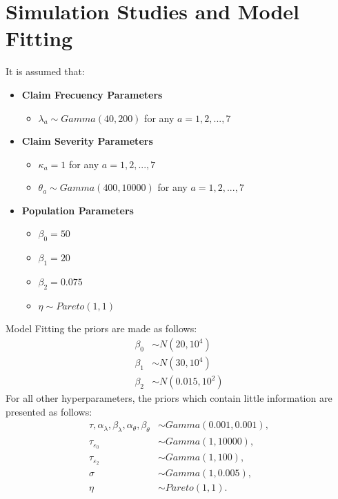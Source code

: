 \documentclass[10pt]{beamer} %
\begin{document}
\section{Simulation Studies and Model Fitting}
\begin{frame}{}
    It is assumed that: \\
\begin{itemize}
	\item \textbf{Claim Frecuency Parameters}
	\begin{itemize}
		\item $\lambda_{a}\sim Gamma(40,200)$ for any $a=1,2,...,7$
	\end{itemize}
	\item \textbf{Claim Severity Parameters}
	\begin{itemize}
		\item $\kappa_{a}=1$ for any $a=1,2,...,7$
		\item $\theta_{a}\sim Gamma(400,10000)$ for any $a=1,2,...,7$ 
	\end{itemize}
	\item \textbf{Population Parameters}
	\begin{itemize}
		\item $\beta_{0}=50$
		\item $\beta_{1}=20$
		\item $\beta_{2}=0.075$
		\item $\eta\sim Pareto(1,1)$	
	\end{itemize}
\end{itemize}
\end{frame}
\begin{frame}{Model Fitting}
    the priors are made as follows:
\begin{align*}
    \beta_0&\sim N(20, 10^4)\\
    \beta_1&\sim N(30, 10^4)\\
    \beta_2&\sim N(0.015, 10^2)
\end{align*}
For all other hyperparameters, the priors which contain little information are presented as follows:
\begin{align*}
    \tau,\alpha_\lambda,\beta_\lambda,\alpha_\theta,\beta_\theta&\sim Gamma(0.001,0.001),\\
    \tau_{\varepsilon_0}&\sim Gamma(1,10000),\\
    \tau_{\varepsilon_2}&\sim Gamma(1,100),\\
    \sigma&\sim Gamma(1,0.005),\\
    \eta&\sim Pareto(1,1).
\end{align*}
\end{frame}
\end{document}
